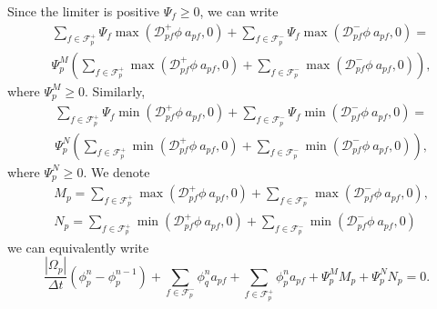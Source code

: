 \documentclass[../thesis.tex]{subfiles}
\begin{document}
Since the limiter is positive \(\Psi_f \geq 0\), we can write
\begin{equation}
    \begin{split}
        &\sum_{f \in \mathcal{F}_p^+}
        \Psi_{f}\max\left( \mathcal{D}^+_{pf}\phi\ a_{pf}, 0 \right)
        +\sum_{f \in \mathcal{F}_p^-}
        \Psi_{f}\max\left( \mathcal{D}^-_{pf}\phi\ a_{pf}, 0 \right)
        =\\
        &\Psi_{p}^M\left(
            \sum_{f \in \mathcal{F}_p^+}
            \max\left( \mathcal{D}^+_{pf}\phi\ a_{pf}, 0 \right)
            +\sum_{f \in \mathcal{F}_p^-}
            \max\left( \mathcal{D}^-_{pf}\phi\ a_{pf}, 0 \right)
        \right),
    \end{split}
\end{equation}
where \(\Psi_{p}^M \geq 0. \)
Similarly,
\begin{equation}
    \begin{split}
        &\sum_{f \in \mathcal{F}_p^+}
        \Psi_{f}\min\left( \mathcal{D}^+_{pf}\phi\ a_{pf}, 0 \right)
        +\sum_{f \in \mathcal{F}_p^-}
        \Psi_{f}\min\left( \mathcal{D}^-_{pf}\phi\ a_{pf}, 0 \right)
        =\\
        &\Psi_{p}^N\left(
            \sum_{f \in \mathcal{F}_p^+}
            \min\left( \mathcal{D}^+_{pf}\phi\ a_{pf}, 0 \right)
            +\sum_{f \in \mathcal{F}_p^-}
            \min\left( \mathcal{D}^-_{pf}\phi\ a_{pf}, 0 \right)
        \right),
    \end{split}
\end{equation}
where \(\Psi_{p}^N \geq 0. \)
We denote
\begin{equation}
    \begin{split}
        &M_p = \sum_{f \in \mathcal{F}_p^+}
        \max\left( \mathcal{D}^+_{pf}\phi\ a_{pf}, 0 \right)
        +\sum_{f \in \mathcal{F}_p^-}
        \max\left( \mathcal{D}^-_{pf}\phi\ a_{pf}, 0 \right),\\
        &N_p = \sum_{f \in \mathcal{F}_p^+}
        \min\left( \mathcal{D}^+_{pf}\phi\ a_{pf}, 0 \right)
        +\sum_{f \in \mathcal{F}_p^-}
        \min\left( \mathcal{D}^-_{pf}\phi\ a_{pf}, 0 \right)
    \end{split}
\end{equation}
we can equivalently write
\begin{equation}
        \frac{|\Omega_p|}{\Delta t}(\phi^{n}_p - \phi_p^{n-1})
        + \sum_{f \in \mathcal{F}_p^-} \phi_q^{n} a_{pf}
        + \sum_{f \in \mathcal{F}_p^+} \phi_p^{n} a_{pf}
        +\Psi_p^M M_p + \Psi_p^N N_p
        = 0.
\end{equation}
\end{document}

